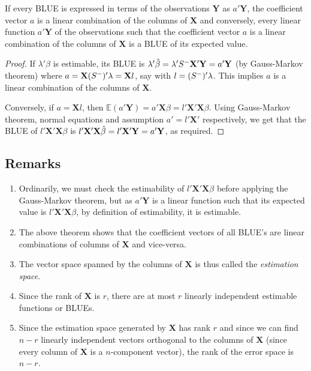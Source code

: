 \documentclass[10pt, a4paper]{article}
\begin{document}
\begin{theorem}
If every BLUE is expressed in terms of the observations \( \mathbf{Y} \) as \( a'\mathbf{Y} \), the coefficient vector \( a \) is a linear combination of the columns of \( \mathbf{X} \) and conversely, every linear function \( a'\mathbf{Y} \) of the observations such that the coefficient vector \( a \) is a linear combination of the columns of \( \mathbf{X} \) is a BLUE of its expected value.
\end{theorem}

\begin{proof}
	If \( \lambda'\beta \) is estimable, its BLUE is \( \lambda' \hat{\beta} = \lambda' S^{-}\mathbf{X}'\mathbf{Y} = a'\mathbf{Y} \) (by Gauss-Markov theorem) where \( a = \mathbf{X}(S^{-})' \lambda = \mathbf{X}l\), say with \( l = (S^{-})'\lambda \). This implies \( a \) is a linear combination of the columns of \( \mathbf{X} \).

	Conversely, if \( a = \mathbf{X}l \), then \( \mathbb{E}(a'\mathbf{Y}) = a'\mathbf{X}\beta = l'\mathbf{X}'\mathbf{X}\beta \). Using Gauss-Markov theorem, normal equations and assumption \( a' = l'\mathbf{X}' \) respectively, we get that the BLUE of \( l'\mathbf{X}'\mathbf{X}\beta \) is \( {l'\mathbf{X}'\mathbf{X}\hat{\beta} = l'\mathbf{X}'\mathbf{Y} = a'\mathbf{Y}} \), as required.
\end{proof}

\subsection{Remarks}
\begin{enumerate}[1.]
	\item Ordinarily, we must check the estimability of \( l'\mathbf{X}'\mathbf{X}\beta \) before applying the Gauss-Markov theorem, but as \( a'\mathbf{Y} \) is a linear function such that its expected value is \( l'\mathbf{X}'\mathbf{X}\beta \), by definition of estimability, it is estimable.
	\item The above theorem shows that the coefficient vectors of all BLUE's are linear combinations of columns of \( \mathbf{X} \) and vice-versa.
	\item The vector space spanned by the columns of \( \mathbf{X} \) is thus called the \textit{estimation space}.
	\item Since the rank of \( \mathbf{X} \) is \( r \), there are at most \( r \) linearly independent estimable functions or BLUEs.
	\item Since the estimation space generated by \( \mathbf{X} \) has rank \( r \) and since we can find \( n-r \) linearly independent vectors orthogonal to the columns of \( \mathbf{X} \) (since every column of \( \mathbf{X} \) is a \mbox{\( n \)-component} vector), the rank of the error space is \( n-r \).
\end{enumerate}
\end{document}
